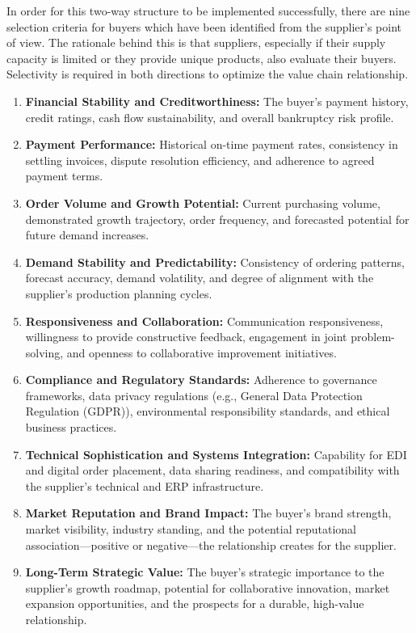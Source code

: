 \documentclass[11pt]{article}
\begin{document}
In order for this two-way structure to be implemented successfully, there are nine selection criteria for buyers which have been identified from the supplier's point of view. The rationale behind this is that suppliers, especially if their supply capacity is limited or they provide unique products, also evaluate their buyers. Selectivity is required in both directions to optimize the value chain relationship.

\begin{enumerate}
\item \textbf{Financial Stability and Creditworthiness:} The buyer's payment history, credit ratings, cash flow sustainability, and overall bankruptcy risk profile.
\item \textbf{Payment Performance:} Historical on-time payment rates, consistency in settling invoices, dispute resolution efficiency, and adherence to agreed payment terms.
\item \textbf{Order Volume and Growth Potential:} Current purchasing volume, demonstrated growth trajectory, order frequency, and forecasted potential for future demand increases.
\item \textbf{Demand Stability and Predictability:} Consistency of ordering patterns, forecast accuracy, demand volatility, and degree of alignment with the supplier's production planning cycles.
\item \textbf{Responsiveness and Collaboration:} Communication responsiveness, willingness to provide constructive feedback, engagement in joint problem-solving, and openness to collaborative improvement initiatives.
\item \textbf{Compliance and Regulatory Standards:} Adherence to governance frameworks, data privacy regulations (e.g., General Data Protection Regulation (GDPR)), environmental responsibility standards, and ethical business practices.
\item \textbf{Technical Sophistication and Systems Integration:} Capability for EDI and digital order placement, data sharing readiness, and compatibility with the supplier's technical and ERP infrastructure.
\item \textbf{Market Reputation and Brand Impact:} The buyer's brand strength, market visibility, industry standing, and the potential reputational association---positive or negative---the relationship creates for the supplier.
\item \textbf{Long-Term Strategic Value:} The buyer's strategic importance to the supplier's growth roadmap, potential for collaborative innovation, market expansion opportunities, and the prospects for a durable, high-value relationship.
\end{enumerate}
\end{document}
